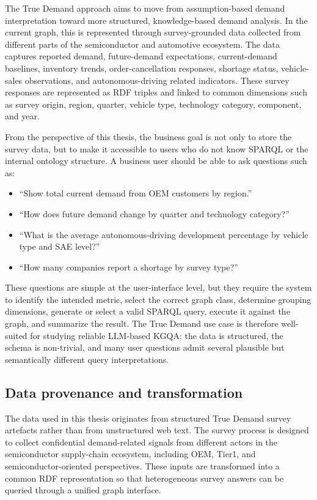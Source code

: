 \documentclass[
  12pt,
  english,
  oneside]{report}
\begin{document}
The True Demand approach aims to move from assumption-based demand interpretation toward more structured, knowledge-based demand analysis. In the current graph, this is represented through survey-grounded data collected from different parts of the semiconductor and automotive ecosystem. The data captures reported demand, future-demand expectations, current-demand baselines, inventory trends, order-cancellation responses, shortage status, vehicle-sales observations, and autonomous-driving related indicators. These survey responses are represented as RDF triples and linked to common dimensions such as survey origin, region, quarter, vehicle type, technology category, component, and year.

From the perspective of this thesis, the business goal is not only to store the survey data, but to make it accessible to users who do not know SPARQL or the internal ontology structure. A business user should be able to ask questions such as:

\begin{itemize}
    \item ``Show total current demand from OEM customers by region.''
    \item ``How does future demand change by quarter and technology category?''
    \item ``What is the average autonomous-driving development percentage by vehicle type and SAE level?''
    \item ``How many companies report a shortage by survey type?''
\end{itemize}

These questions are simple at the user-interface level, but they require the system to identify the intended metric, select the correct graph class, determine grouping dimensions, generate or select a valid SPARQL query, execute it against the graph, and summarize the result. The True Demand use case is therefore well-suited for studying reliable LLM-based KGQA: the data is structured, the schema is non-trivial, and many user questions admit several plausible but semantically different query interpretations.

\subsection{Data provenance and transformation}
\label{subsec:data-provenance-transformation}

The data used in this thesis originates from structured True Demand survey artefacts rather than from unstructured web text. The survey process is designed to collect confidential demand-related signals from different actors in the semiconductor supply-chain ecosystem, including OEM, Tier1, and semiconductor-oriented perspectives. These inputs are transformed into a common RDF representation so that heterogeneous survey answers can be queried through a unified graph interface.
\end{document}
